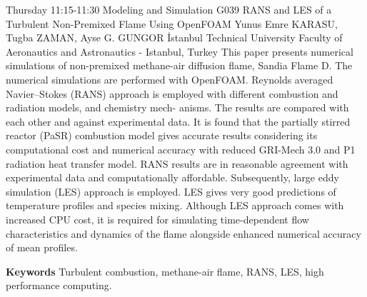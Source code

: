 
    \begin{abstract_basarim}
    {Thursday 11:15-11:30}
    {Modeling and Simulation}
    {G039}
    {RANS and LES of a Turbulent Non-Premixed Flame Using OpenFOAM}
    {%
    Yunus Emre KARASU, Tugba ZAMAN, Ayse G. GUNGOR}
    {%
    }
    {%
    İstanbul Technical University Faculty of Aeronautics and Astronautics - Istanbul, Turkey}
    This paper presents numerical simulations of non-premixed methane-air diffusion flame, Sandia Flame D. The numerical simulations are performed with OpenFOAM. Reynolds averaged Navier–Stokes (RANS) approach is employed with different combustion and radiation models, and chemistry mech- anisms. The results are compared with each other and against experimental data. It is found that the partially stirred reactor (PaSR) combustion model gives accurate results considering its computational cost and numerical accuracy with reduced GRI-Mech 3.0 and P1 radiation heat transfer model. RANS results are in reasonable agreement with experimental data and computationally affordable. Subsequently, large eddy simulation (LES) approach is employed. LES gives very good predictions of temperature profiles and species mixing. Although LES approach comes with increased CPU cost, it is required for simulating time-dependent flow characteristics and dynamics of the flame alongside enhanced numerical accuracy of mean profiles. 
    
        \textbf{Keywords} \newline{}Turbulent combustion, methane-air flame, RANS, LES, high performance computing.
    \end{abstract_basarim}
    